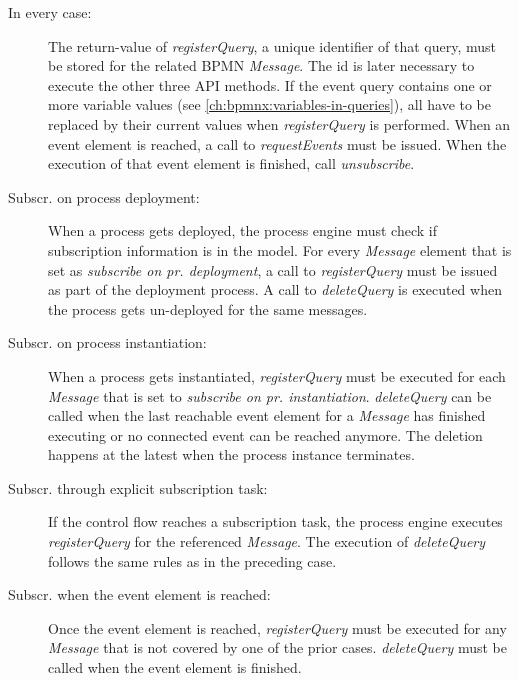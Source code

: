 \begin{description}
	\item[In every case:] 
		The return-value of \textit{registerQuery}, a unique identifier of that query, must be stored for the related BPMN \textit{Message}. The id is later necessary to execute the other three API methods.
		If the event query contains one or more variable values (see \autoref{ch:bpmnx:variables-in-queries}), all have to be replaced by their current values when \textit{registerQuery} is performed.
		When an event element is reached, a call to \textit{requestEvents} must be issued. When the execution of that event element is finished, call \textit{unsubscribe}.
	\item[Subscr. on process deployment:]
		When a process gets deployed, the process engine must check if subscription information is in the model. For every \textit{Message} element that is set as \textit{subscribe on pr. deployment}, a call to \textit{registerQuery} must be issued as part of the deployment process. A call to \textit{deleteQuery} is executed when the process gets un-deployed for the same messages.
	\item[Subscr. on process instantiation:] 
		When a process gets instantiated, \textit{registerQuery} must be executed for each \textit{Message} that is set to \textit{subscribe on pr. instantiation}. \textit{deleteQuery} can be called when the last reachable event element for a \textit{Message} has finished executing or no connected event can be reached anymore. The deletion happens at the latest when the process instance terminates.
	\item[Subscr. through explicit subscription task:]
		If the control flow reaches a subscription task, the process engine executes \textit{registerQuery} for the referenced \textit{Message}. The execution of \textit{deleteQuery} follows the same rules as in the preceding case.
		\pagebreak
	\item[Subscr. when the event element is reached:]
		Once the event element is reached, \textit{registerQuery} must be executed for any \textit{Message} that is not covered by one of the prior cases. \textit{deleteQuery} must be called when the event element is finished.
\end{description}


